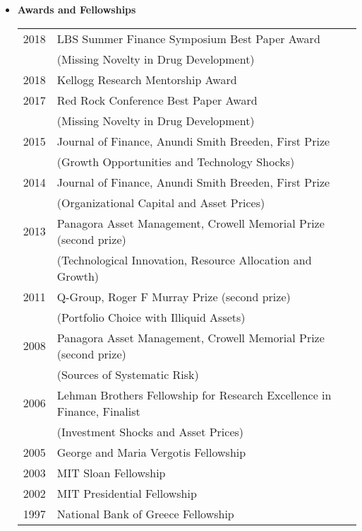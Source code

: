\documentclass[11pt,letterpaper,serif,overlapped]{res}
\begin{document}
\begin{resume}
\clearpage
\begin{itemize}
\item \textbf{Awards and Fellowships}\\
\begin{longtable}{ll}
2018 & LBS  Summer Finance Symposium Best Paper Award \\ &  (Missing Novelty in Drug Development)\\
2018 & Kellogg Research Mentorship Award\\
2017 & Red Rock Conference Best Paper Award \\ &  (Missing Novelty in Drug Development)\\
2015 &  Journal of Finance, Anundi Smith Breeden, First Prize\\ &  (Growth Opportunities and Technology Shocks)\\
2014 & Journal of Finance, Anundi Smith Breeden, First Prize \\ & (Organizational Capital and Asset Prices)\\
2013 & Panagora Asset Management, Crowell Memorial Prize (second prize)\\& (Technological Innovation, Resource Allocation and Growth)\\
2011 & Q-Group, Roger F Murray Prize (second prize)\\ & (Portfolio Choice with Illiquid Assets)\\
2008 & Panagora Asset Management, Crowell Memorial Prize (second prize) \\ & (Sources of Systematic Risk) \\
2006  & Lehman Brothers Fellowship for Research Excellence in Finance, Finalist\\ & (Investment Shocks and Asset Prices)\\
2005 & George and Maria Vergotis Fellowship\\
2003& MIT Sloan Fellowship\\
2002 & MIT Presidential Fellowship\\
1997 & National Bank of Greece Fellowship \\
\end{longtable}





\vspace{0.5cm}


\end{itemize}
\end{resume}
\end{document}

